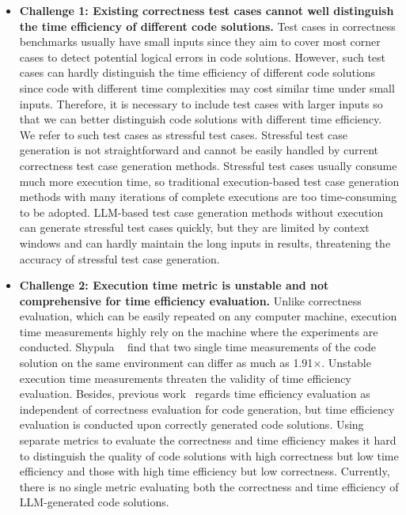 \begin{itemize}[wide=0pt]%
    \item \textbf{Challenge 1: Existing correctness test cases cannot well distinguish the time efficiency of different code solutions.} Test cases in correctness benchmarks usually have small inputs since they aim to cover most corner cases to detect potential logical errors in code solutions. However, such test cases can hardly distinguish the time efficiency of different code solutions since code with different time complexities may cost similar time under small inputs. Therefore, it is necessary to include test cases with larger inputs so that we can better distinguish code solutions with different time efficiency. We refer to such test cases as stressful test cases. Stressful test case generation is not straightforward and cannot be easily handled by current correctness test case generation methods. Stressful test cases usually consume much more execution time, so traditional execution-based test case generation methods with many iterations of complete executions are too time-consuming to be adopted. LLM-based test case generation methods without execution can generate stressful test cases quickly, but they are limited by context windows and can hardly maintain the long inputs in results, threatening the accuracy of stressful test case generation.
    \item \textbf{Challenge 2: Execution time metric is unstable and not comprehensive for time efficiency evaluation.}  Unlike correctness evaluation, which can be easily repeated on any computer machine, execution time measurements highly rely on the machine where the experiments are conducted. Shypula \etal~\cite{shypula2024learning} find that two single time measurements of the code solution on the same environment can differ as much as 1.91$\times$. Unstable execution time measurements threaten the validity of time efficiency evaluation. Besides, previous work~\cite{shypula2024learning,effibench} regards time efficiency evaluation as independent of correctness evaluation for code generation, but time efficiency evaluation is conducted upon correctly generated code solutions. Using separate metrics to evaluate the correctness and time efficiency makes it hard to distinguish the quality of code solutions with high correctness but low time efficiency and those with high time efficiency but low correctness. Currently, there is no single metric evaluating both the correctness and time efficiency of LLM-generated code solutions.

\end{itemize}


